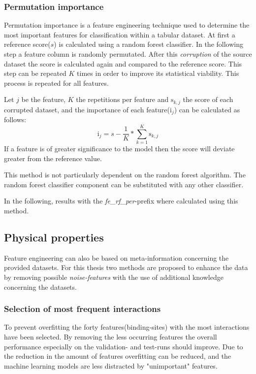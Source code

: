 \subsubsection*{Permutation importance}
Permutation importance is a feature engineering technique used to determine the most important features for classification within a tabular dataset.
At first a reference score($s$) is calculated using a random forest classifier. In the following step a feature column is randomly permutated.
After this \textit{corruption} of the source dataset the score is calculated again and compared to the reference score. This step can be repeated $K$ times in order
to improve its statistical viability. This process is repeated for all features.

Let $j$ be the feature, $K$ the repetitions per feature and $\mathrm{s}_{k,j}$ the score of each corrupted dataset, and the importance of each
feature($\mathrm{i}_{j}$) can be calculated as follows:
\begin{equation*}
    \mathrm{i}_{j} = s -\frac{1}{K}*\sum_{k=1}^{K} \mathrm{s}_{k,j}
\end{equation*}
If a feature is of greater significance to the model then the score will deviate greater from the reference value\cite[]{permutation_importance}.

This method is not particularly dependent on the random forest algorithm. The random forest classifier component can be substituted with any other classifier.

In the following, results with the \textit{fe\_rf\_per}-prefix where calculated using this method.

\subsection{Physical properties}
Feature engineering can also be based on meta-information concerning the provided datasets.
For this thesis two methods are proposed to enhance the data by removing possible \textit{noise-features} with the use of additional
knowledge concerning the datasets.
\subsubsection*{Selection of most frequent interactions}
To prevent overfitting the forty features(binding-sites) with the most interactions have been selected.
By removing the less occurring features the overall performance especially on the validation- and test-runs should improve.
Due to the reduction in the amount of features overfitting can be reduced, and the machine learning models are less distracted by
"unimportant" features.

